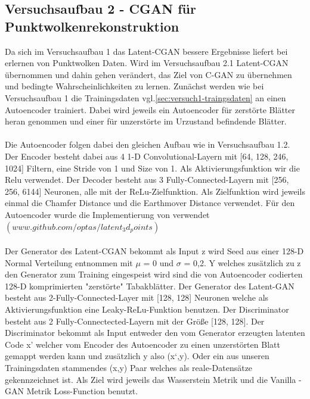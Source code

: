 \documentclass{llncs}
\begin{document}
\subsection{Versuchsaufbau 2 - CGAN für Punktwolkenrekonstruktion }\label{sec:versuch2-aufbau}

Da sich im Versuchsaufbau 1 das Latent-CGAN bessere Ergebnisse liefert bei erlernen von Punktwolken Daten. Wird im Versuchsaufbau 2.1 Latent-CGAN übernommen und dahin gehen verändert, das Ziel von C-GAN zu übernehmen und bedingte Wahrscheinlichkeiten zu lernen. Zunächst werden wie bei Versuchsaufbau 1 die Trainingsdaten vgl.\ref{sec:versuch1-traingsdaten} an einen Autoencoder trainiert. Dabei wird jeweils ein Autoencoder für zerstörte Blätter heran genommen und einer für unzerstörte im Urzustand befindende Blätter.
\\\\
Die Autoencoder folgen dabei den gleichen Aufbau wie in Versuchsaufbau 1.2.  Der Encoder besteht dabei aus 4 1-D Convolutional-Layern mit [64, 128, 246, 1024] Filtern, eine Stride von 1 und Size von 1. Als Aktivierungsfunktion wir die Relu verwendet. Der Decoder besteht aus 3 Fully-Connected-Layern mit [256, 256, 6144] Neuronen, alle mit der ReLu-Zielfunktion. Als Zielfunktion wird jeweils einmal die Chamfer Distance und die Earthmover Distance verwendet. Für den Autoencoder wurde die Implementierung von \cite{3dgan} verwendet $(www.github.com/optas/latent_3d_points)$ 
\\\\
Der Generator des Latent-CGAN bekommt als Input z wird Seed aus einer 128-D Normal Verteilung entnommen mit $\mu$ = 0 und $\sigma$ =  0,2. Y welches zusätzlich zu z den Generator zum Training eingespeist wird sind die von Autoencoder codierten 128-D komprimierten "zerstörte" Tabakblätter. Der Generator des Latent-GAN besteht aus 2-Fully-Connected-Layer mit [128, 128] Neuronen welche als Aktivierungsfunktion eine Leaky-ReLu-Funktion benutzen. Der Discriminator besteht aus 2 Fully-Connectected-Layern mit der Größe [128, 128]. Der Discriminator bekommt als Input entweder den vom Generator erzeugten latenten Code x' welcher vom Encoder des Autoencoder zu einen unzerstörten Blatt gemappt werden kann und zusätzlich y also (x`,y). Oder ein aus unseren Trainingsdaten stammendes (x,y) Paar welches als reale-Datensätze gekennzeichnet ist. Als Ziel wird jeweils das Wasserstein Metrik und die Vanilla - GAN Metrik Loss-Function benutzt.
\\\\
\end{document}
